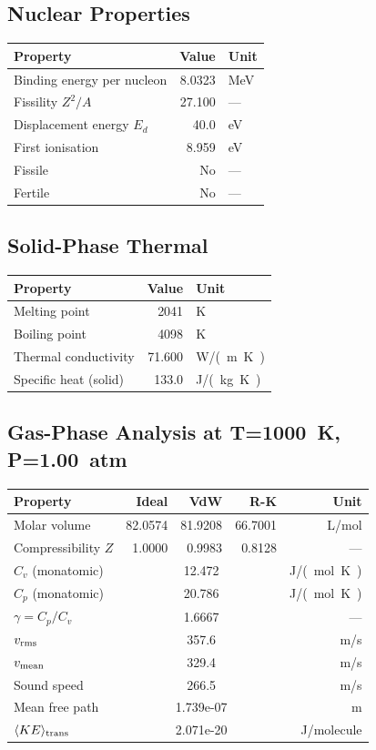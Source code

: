 \documentclass[11pt,a4paper]{article}
\begin{document}
\subsection{Nuclear Properties}
\begin{tabular}{lrl}
  \toprule
  Property & Value & Unit \\
  \midrule
  Binding energy per nucleon & 8.0323 & \si{MeV} \\
  Fissility $Z^2/A$ & 27.100 & --- \\
  Displacement energy $E_d$ & 40.0 & \si{eV} \\
  First ionisation & 8.959 & \si{eV} \\
  Fissile & No & --- \\
  Fertile & No & --- \\
  \bottomrule
\end{tabular}

\subsection{Solid-Phase Thermal}
\begin{tabular}{lrl}
  \toprule
  Property & Value & Unit \\
  \midrule
  Melting point & 2041 & \si{K} \\
  Boiling point & 4098 & \si{K} \\
  Thermal conductivity & 71.600 & \si{W/(m.K)} \\
  Specific heat (solid) & 133.0 & \si{J/(kg.K)} \\
  \bottomrule
\end{tabular}

\subsection{Gas-Phase Analysis at T=\SI{1000}{K}, P=\SI{1.00}{atm}}
\begin{tabular}{lrrrr}
  \toprule
  Property & Ideal & VdW & R-K & Unit \\
  \midrule
  Molar volume & 82.0574 & 81.9208 & 66.7001 & \si{L/mol} \\
  Compressibility $Z$ & 1.0000 & 0.9983 & 0.8128 & --- \\
  \midrule
  $C_v$ (monatomic) & \multicolumn{3}{c}{12.472} & \si{J/(mol.K)} \\
  $C_p$ (monatomic) & \multicolumn{3}{c}{20.786} & \si{J/(mol.K)} \\
  $\gamma = C_p/C_v$ & \multicolumn{3}{c}{1.6667} & --- \\
  $v_{\rm rms}$ & \multicolumn{3}{c}{357.6} & \si{m/s} \\
  $v_{\rm mean}$ & \multicolumn{3}{c}{329.4} & \si{m/s} \\
  Sound speed & \multicolumn{3}{c}{266.5} & \si{m/s} \\
  Mean free path & \multicolumn{3}{c}{1.739e-07} & \si{m} \\
  $\langle KE \rangle_{\rm trans}$ & \multicolumn{3}{c}{2.071e-20} & \si{J/molecule} \\
  \bottomrule
\end{tabular}
\end{document}
